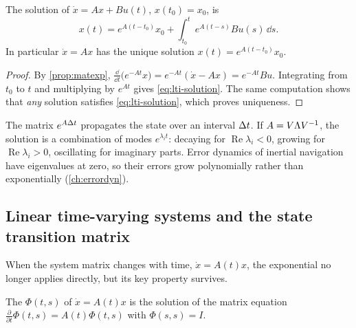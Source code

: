 \begin{theorem}
\label{thm:lti-solution}
The solution of $\dot x = Ax + Bu(t)$, $x(t_0) = x_0$, is
\begin{equation}
  x(t) = e^{A(t - t_0)}x_0 + \int_{t_0}^t e^{A(t - s)}Bu(s)\,\dd s .
  \label{eq:lti-solution}
\end{equation}
In particular $\dot x = Ax$ has the unique solution $x(t) = e^{A(t - t_0)}x_0$.
\end{theorem}
\begin{proof}
By \cref{prop:matexp}, $\frac{\dd}{\dd t}\big(e^{-At}x\big) = e^{-At}(\dot x - Ax) = e^{-At}Bu$. Integrating from $t_0$ to $t$ and multiplying by $e^{At}$ gives
\eqref{eq:lti-solution}. The same computation shows that \emph{any} solution satisfies \eqref{eq:lti-solution}, which proves uniqueness.
\end{proof}

The matrix $e^{A{\Delta t}}$ propagates the state over an interval ${\Delta t}$. If $A = V\Lambda V^{-1}$, the solution is a combination of modes
$e^{\lambda_it}$: decaying for $\operatorname{Re}\lambda_i < 0$, growing for $\operatorname{Re}\lambda_i > 0$, oscillating for imaginary parts. Error
dynamics of inertial navigation have eigenvalues at zero, so their errors grow polynomially rather than exponentially
(\cref{ch:errordyn}).

\subsection{Linear time-varying systems and the state transition matrix}

When the system matrix changes with time, $\dot x = A(t)x$, the exponential no longer applies directly, but its key property survives.

\begin{definition}
The  $\Phi(t, s)$ of $\dot x = A(t)x$ is the solution of the matrix equation
$\frac{\partial}{\partial t}\Phi(t, s) = A(t)\Phi(t, s)$ with $\Phi(s, s) = I$.
\end{definition}

